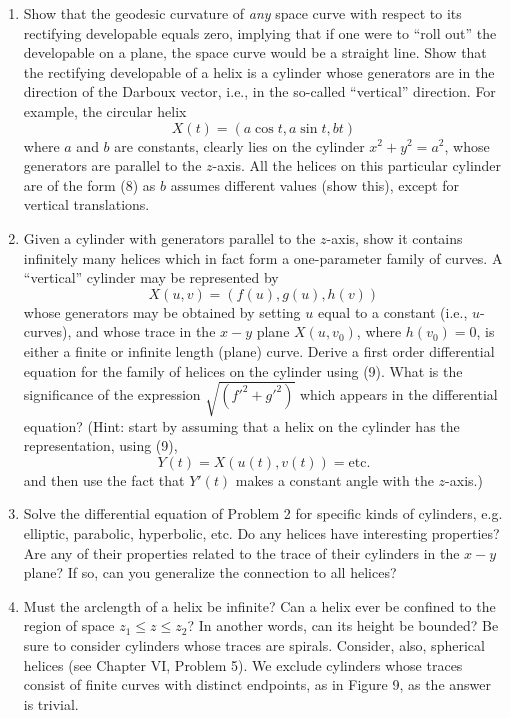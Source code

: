 \documentclass{book}
\begin{document}
\begin{enumerate}[1.]
  \item Show that the geodesic curvature of \emph{any} space curve with respect to its rectifying developable equals zero, implying that if one were to ``roll out'' the developable on a plane, the space curve would be a straight line. Show that the rectifying developable of a helix is a cylinder whose generators are in the direction of the Darboux vector, i.e., in the so-called ``vertical'' direction. For example, the circular helix
    \begin{equation}
      X(t) = (a \cos t, a \sin t, bt)
    \end{equation}
    where $a$ and $b$ are constants, clearly lies on the cylinder $x^{2} + y^{2} = a^{2}$, whose generators are parallel to the $z$-axis. All the helices on this particular cylinder are of the form (8) as $b$ assumes different values (show this), except for vertical translations.
  \item Given a cylinder with generators parallel to the $z$-axis, show it contains infinitely many helices which in fact form a one-parameter family of curves. A ``vertical'' cylinder may be represented by
    \begin{equation}
      X(u,v) = (f(u), g(u), h(v))
    \end{equation}
    whose generators may be obtained by setting $u$ equal to a constant (i.e., $u$-curves), and whose trace in the $x-y$ plane $X(u,v_{0})$, where $h(v_{0}) = 0$, is either a finite or infinite length (plane) curve. Derive a first order differential equation for the family of helices on the cylinder using (9). What is the significance of the expression $\sqrt{(f'^{2} + g'^{2})}$ which appears in the differential equation? (Hint: start by assuming that a helix on the cylinder has the representation, using (9),
    \begin{equation}
      Y(t) = X(u(t), v(t)) = \mathrm{ etc.}
    \end{equation}
    and then use the fact that $Y'(t)$ makes a constant angle with the $z$-axis.)
  \item Solve the differential equation of Problem 2 for specific kinds of cylinders, e.g. elliptic, parabolic, hyperbolic, etc. Do any helices have interesting properties? Are any of their properties related to the trace of their cylinders in the $x-y$ plane? If so, can you generalize the connection to all helices?
  \item Must the arclength of a helix be infinite? Can a helix ever be confined to the region of space $z_{1} \leq z \leq z_{2}$? In another words, can its height be bounded? Be sure to consider cylinders whose traces are spirals. Consider, also, spherical helices (see Chapter VI, Problem 5). We exclude cylinders whose traces consist of finite curves with distinct endpoints, as in Figure 9, as the answer is trivial.


\end{enumerate}
\end{document}
